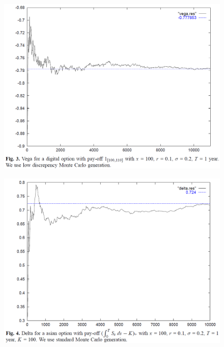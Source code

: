 \documentclass{beamer}
\begin{document}
\begin{frame}
  \begin{figure}
  \centering
  \includegraphics[scale=0.3]{fig3_fournie_99_malliavin_mc.png}\\
\end{figure}
\end{frame}

\begin{frame}
  \begin{figure}
  \centering
  \includegraphics[scale=0.3]{fig4_fournie_99_malliavin_mc.png}\\
\end{figure}
\end{frame}
\end{document}

